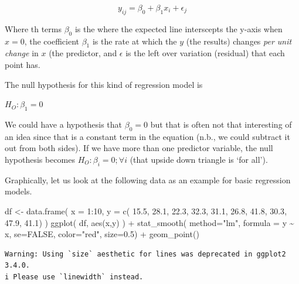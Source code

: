 \documentclass[
  letterpaper,
]{book}
\newenvironment{Shaded}{\begin{snugshade}}{\end{snugshade}}
\newcommand{\AttributeTok}[1]{\textcolor[rgb]{0.40,0.45,0.13}{#1}}
\newcommand{\ConstantTok}[1]{\textcolor[rgb]{0.56,0.35,0.01}{#1}}
\newcommand{\DecValTok}[1]{\textcolor[rgb]{0.68,0.00,0.00}{#1}}
\newcommand{\FloatTok}[1]{\textcolor[rgb]{0.68,0.00,0.00}{#1}}
\newcommand{\FunctionTok}[1]{\textcolor[rgb]{0.28,0.35,0.67}{#1}}
\newcommand{\NormalTok}[1]{\textcolor[rgb]{0.00,0.23,0.31}{#1}}
\newcommand{\OtherTok}[1]{\textcolor[rgb]{0.00,0.23,0.31}{#1}}
\newcommand{\SpecialCharTok}[1]{\textcolor[rgb]{0.37,0.37,0.37}{#1}}
\newcommand{\StringTok}[1]{\textcolor[rgb]{0.13,0.47,0.30}{#1}}
\begin{document}
\[
y_{ij} = \beta_0 + \beta_1 x_{i} + \epsilon_j
\]

Where th terms \(\beta_0\) is the where the expected line interscepts
the y-axis when \(x = 0\), the coefficient \(\beta_1\) is the rate at
which the \(y\) (the results) changes \emph{per unit change} in \(x\)
(the predictor, and \(\epsilon\) is the left over variation (residual)
that each point has.

The null hypothesis for this kind of regression model is

\(H_O: \beta_1 = 0\)

We could have a hypothesis that \(\beta_0 = 0\) but that is often not
that interesting of an idea since that is a constant term in the
equation (n.b., we could subtract it out from both sides). If we have
more than one predictor variable, the null hypothesis becomes
\(H_O: \beta_i = 0; \forall i\) (that upside down triangle is `for
all').

Graphically, let us look at the following data as an example for basic
regression models.

\begin{Shaded}
\begin{Highlighting}[]
\NormalTok{df }\OtherTok{\textless{}{-}} \FunctionTok{data.frame}\NormalTok{( }\AttributeTok{x =} \DecValTok{1}\SpecialCharTok{:}\DecValTok{10}\NormalTok{,}
                  \AttributeTok{y =} \FunctionTok{c}\NormalTok{( }\FloatTok{15.5}\NormalTok{, }\FloatTok{28.1}\NormalTok{, }\FloatTok{22.3}\NormalTok{, }
                         \FloatTok{32.3}\NormalTok{, }\FloatTok{31.1}\NormalTok{, }\FloatTok{26.8}\NormalTok{, }
                         \FloatTok{41.8}\NormalTok{, }\FloatTok{30.3}\NormalTok{, }\FloatTok{47.9}\NormalTok{, }
                         \FloatTok{41.1}\NormalTok{) )}
\FunctionTok{ggplot}\NormalTok{( df, }\FunctionTok{aes}\NormalTok{(x,y) ) }\SpecialCharTok{+} 
  \FunctionTok{stat\_smooth}\NormalTok{( }\AttributeTok{method=}\StringTok{"lm"}\NormalTok{, }
               \AttributeTok{formula =}\NormalTok{ y }\SpecialCharTok{\textasciitilde{}}\NormalTok{ x, }
               \AttributeTok{se=}\ConstantTok{FALSE}\NormalTok{, }
               \AttributeTok{color=}\StringTok{"red"}\NormalTok{, }\AttributeTok{size=}\FloatTok{0.5}\NormalTok{) }\SpecialCharTok{+} 
  \FunctionTok{geom\_point}\NormalTok{() }
\end{Highlighting}
\end{Shaded}

\begin{verbatim}
Warning: Using `size` aesthetic for lines was deprecated in ggplot2 3.4.0.
i Please use `linewidth` instead.
\end{verbatim}
\end{document}
